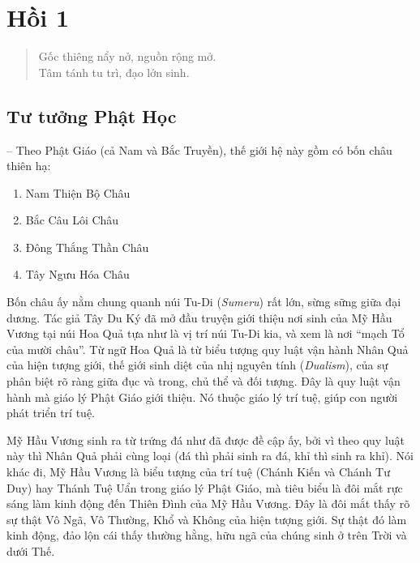 \chapter{Hồi 1} %
\label{cha:hoi_thu_1}

\begin{verse}
\begin{itshape}
Gốc thiêng nẩy nở, nguồn rộng mở.\\
Tâm tánh tu trì, đạo lớn sinh.
\end{itshape}
\end{verse}

\section{Tư tưởng Phật Học} %
\label{sec:hoi_1_tu_tuong_phat_hoc}

-- Theo Phật Giáo (cả Nam và Bắc Truyền), thế giới hệ này gồm có bốn châu thiên hạ:

\begin{multicols}{2}
\begin{enumerate}[label=\itshape\arabic*\upshape/]
    \item Nam Thiện Bộ Châu

    \item Bắc Câu Lôi Châu

    \item Đông Thắng Thần Châu

    \item Tây Ngưu Hóa Châu
\end{enumerate}
\end{multicols}

Bốn châu ấy nằm chung quanh núi Tu-Di (\emph{Sumeru}) rất lớn, sừng sững giữa đại dương. Tác giả Tây Du Ký đã mở đầu truyện giới thiệu nơi sinh của Mỹ Hầu Vương tại núi Hoa Quả tựa như là vị trí núi Tu-Di kia, và xem là nơi ``mạch Tổ của mười châu''. Từ ngữ Hoa Quả là từ biểu tượng quy luật vận hành Nhân Quả của hiện tượng giới, thế giới sinh diệt của nhị nguyên tính (\emph{Dualism}), của sự phân biệt rõ ràng giữa đục và trong, chủ thể và đối tượng. Đây là quy luật vận hành mà giáo lý Phật Giáo giới thiệu. Nó thuộc giáo lý trí tuệ, giúp con người phát triển trí tuệ.

Mỹ Hầu Vương sinh ra từ trứng đá như đã được đề cập ấy, bởi vì theo quy luật này thì Nhân Quả phải cùng loại (đá thì phải sinh ra đá, khỉ thì sinh ra khỉ). Nói khác đi, Mỹ Hầu Vương là biểu tượng của trí tuệ (Chánh Kiến và Chánh Tư Duy) hay Thánh Tuệ Uẩn trong giáo lý Phật Giáo, mà tiêu biểu là đôi mắt rực sáng làm kinh động đến Thiên Đình của Mỹ Hầu Vương. Đây là đôi mắt thấy rõ sự thật Vô Ngã, Vô Thường, Khổ và Không của hiện tượng giới. Sự thật đó làm kinh động, đảo lộn cái thấy thường hằng, hữu ngã của chúng sinh ở trên Trời và dưới Thế.

